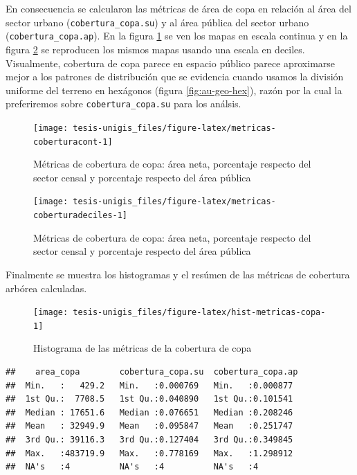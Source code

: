 \documentclass[12pt,]{book}
\begin{document}
En consecuencia se calcularon las métricas de área de copa en relación
al área del sector urbano (\texttt{cobertura\_copa.su}) y al área
pública del sector urbano (\texttt{cobertura\_copa.ap}). En la figura
\ref{fig:metricas-coberturacont} se ven los mapas en escala continua y
en la figura \ref{fig:metricas-coberturadeciles} se reproducen los
mismos mapas usando una escala en deciles. Visualmente, cobertura de
copa parece en espacio público parece aproximarse mejor a los patrones
de distribución que se evidencia cuando usamos la división uniforme del
terreno en hexágonos (figura \ref{fig:au-geo-hex}), razón por la cual la
preferiremos sobre \texttt{cobertura\_copa.su} para los análsis.

\begin{figure}
\texttt{[image: tesis-unigis\_files/figure-latex/metricas-coberturacont-1]} \caption{Métricas de cobertura de copa: área neta, porcentaje respecto del sector censal y porcentaje respecto del área pública }\label{fig:metricas-coberturacont}
\end{figure}

\begin{figure}
\texttt{[image: tesis-unigis\_files/figure-latex/metricas-coberturadeciles-1]} \caption{Métricas de cobertura de copa: área neta, porcentaje respecto del sector censal y porcentaje respecto del área pública }\label{fig:metricas-coberturadeciles}
\end{figure}

Finalmente se muestra los histogramas y el resúmen de las métricas de
cobertura arbórea calculadas.

\begin{figure}
\texttt{[image: tesis-unigis\_files/figure-latex/hist-metricas-copa-1]} \caption{Histograma de las métricas de la cobertura de copa}\label{fig:hist-metricas-copa}
\end{figure}

\begin{verbatim}
##    area_copa        cobertura_copa.su  cobertura_copa.ap 
##  Min.   :   429.2   Min.   :0.000769   Min.   :0.000877  
##  1st Qu.:  7708.5   1st Qu.:0.040890   1st Qu.:0.101541  
##  Median : 17651.6   Median :0.076651   Median :0.208246  
##  Mean   : 32949.9   Mean   :0.095847   Mean   :0.251747  
##  3rd Qu.: 39116.3   3rd Qu.:0.127404   3rd Qu.:0.349845  
##  Max.   :483719.9   Max.   :0.778169   Max.   :1.298912  
##  NA's   :4          NA's   :4          NA's   :4
\end{verbatim}
\end{document}
